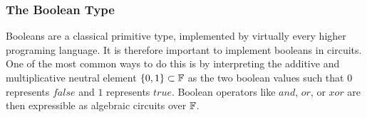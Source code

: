 \subsubsection{The Boolean Type} 
Booleans are a classical primitive type, implemented by virtually every higher programing language. It is therefore important to implement booleans in circuits. One of the most common ways to do this is by interpreting the additive and multiplicative neutral element $\{0,1\}\subset \mathbb{F}$ as the two boolean values such that $0$ represents $false$ and $1$ represents $true$. Boolean operators like $and$, $or$, or $xor$ are then expressible as algebraic circuits over $\mathbb{F}$. 

